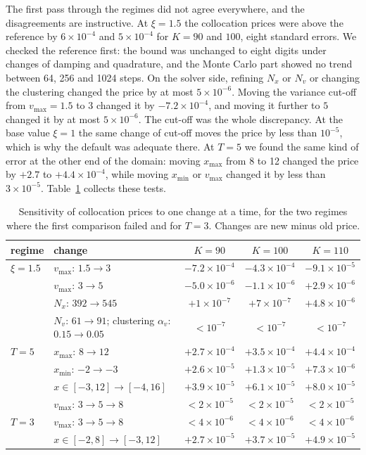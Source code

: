 The first pass through the regimes did not agree everywhere, and the disagreements are instructive. At
$\xi=1.5$ the collocation prices were above the reference by $6\times10^{-4}$ and $5\times10^{-4}$ for
$K=90$ and $100$, eight standard errors. We checked the reference first: the bound was unchanged to eight
digits under changes of damping and quadrature, and the Monte Carlo part showed no trend between 64, 256 and
1024 steps. On the solver side, refining $N_x$ or $N_v$ or changing the clustering changed the price by at
most $5\times10^{-6}$. Moving the variance cut-off from $v_{\max}=1.5$ to $3$ changed it by
$-7.2\times10^{-4}$, and moving it further to $5$ changed it by at most $5\times10^{-6}$. The cut-off was
the whole discrepancy. At the base value $\xi=1$ the same change of cut-off moves the price by less than
$10^{-5}$, which is why the default was adequate there. At $T=5$ we found the same kind of error at the
other end of the domain: moving $x_{\max}$ from 8 to 12 changed the price by $+2.7$ to $+4.4\times10^{-4}$,
while moving $x_{\min}$ or $v_{\max}$ changed it by less than $3\times10^{-5}$. Table~\ref{tab:trunc}
collects these tests.

\begin{table}[t]
\centering
\caption{Sensitivity of collocation prices to one change at a time, for the two regimes where the first
comparison failed and for $T=3$. Changes are new minus old price.}
\label{tab:trunc}
\small
\begin{tabular}{llccc}
\toprule
regime & change & $K=90$ & $K=100$ & $K=110$\\
\midrule
$\xi=1.5$ & $v_{\max}$: $1.5\to3$ & $-7.2\times10^{-4}$ & $-4.3\times10^{-4}$ & $-9.1\times10^{-5}$\\
          & $v_{\max}$: $3\to5$   & $-5.0\times10^{-6}$ & $-1.1\times10^{-6}$ & $+2.9\times10^{-6}$\\
          & $N_x$: $392\to545$     & $+1\times10^{-7}$   & $+7\times10^{-7}$   & $+4.8\times10^{-6}$\\
          & $N_v$: $61\to91$; clustering $\alpha_v$: $0.15\to0.05$ & $<10^{-7}$ & $<10^{-7}$ & $<10^{-7}$\\
$T=5$     & $x_{\max}$: $8\to12$  & $+2.7\times10^{-4}$ & $+3.5\times10^{-4}$ & $+4.4\times10^{-4}$\\
          & $x_{\min}$: $-2\to-3$ & $+2.6\times10^{-5}$ & $+1.3\times10^{-5}$ & $+7.3\times10^{-6}$\\
          & $x\in[-3,12]\to[-4,16]$ & $+3.9\times10^{-5}$ & $+6.1\times10^{-5}$ & $+8.0\times10^{-5}$\\
          & $v_{\max}$: $3\to5\to8$ & $<2\times10^{-5}$ & $<2\times10^{-5}$ & $<2\times10^{-5}$\\
$T=3$     & $v_{\max}$: $3\to5\to8$ & $<4\times10^{-6}$ & $<4\times10^{-6}$ & $<4\times10^{-6}$\\
          & $x\in[-2,8]\to[-3,12]$ & $+2.7\times10^{-5}$ & $+3.7\times10^{-5}$ & $+4.9\times10^{-5}$\\
\bottomrule
\end{tabular}
\end{table}

